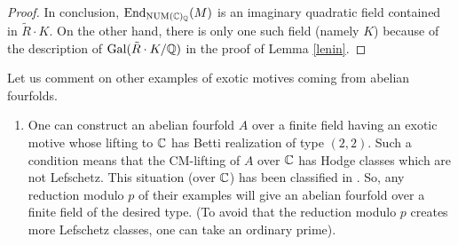 \documentclass[11pt]{amsart}
\begin{document}
\begin{appendices}
\begin{proof}
In conclusion,  $\textnormal{End}_{\mathrm{NUM}(\mathbb{C})_{\mathbb{Q}}}  (M)$ is an imaginary quadratic field contained in $ \tilde{R}\cdot K$. On the other hand,  there is only one such field (namely $K$) because of the description of  $\textnormal{Gal} (\tilde{R}\cdot K/\mathbb{Q})$ in the proof of Lemma \ref{lenin}.
\end{proof}
\begin{remark}\label{altreesotiche}
Let us comment on other examples of exotic motives coming from abelian fourfolds.
\begin{enumerate}
\item One can construct  an abelian fourfold $A$ over a finite field having an exotic motive whose lifting to $\mathbb{C}$ has Betti realization of type $(2,2)$. Such a condition means that  the CM-lifting of $A$  over $\mathbb{C}$   has Hodge classes which are not Lefschetz. This   situation (over $\mathbb{C}$) has been classified in \cite{MooZa}. So, any reduction modulo $p$ of their examples will give an abelian fourfold over a finite field of the desired type. (To avoid that the reduction modulo $p$ creates more Lefschetz classes, one can take an ordinary prime). 


\end{enumerate}
\end{remark}
\end{appendices}
\end{document}
